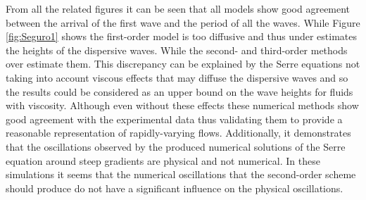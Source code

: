 \documentclass[SingleSpace,12pt]{Serre_ASCE}
\begin{document}
From all the related figures it can be seen that all models show good agreement between the arrival of the first wave and the period of all the waves. While Figure \ref{fig:Seguro1} shows the first-order model is too diffusive and thus under estimates the heights of the dispersive waves. While the second- and third-order methods over estimate them. This discrepancy can be explained by the Serre equations not taking into account viscous effects that may diffuse the dispersive waves and so the results could be considered as an upper bound on the wave heights for fluids with viscosity. Although even without these effects these numerical methods show good agreement with the experimental data thus validating them to provide a reasonable representation of rapidly-varying flows. Additionally, it demonstrates that the oscillations observed by the produced numerical solutions of the Serre equation around steep gradients are physical and not numerical. In these simulations it seems that the numerical oscillations that the second-order scheme should produce \cite{Zoppou-Roberts-1996} do not have a significant influence on the physical oscillations.  
\end{document}
